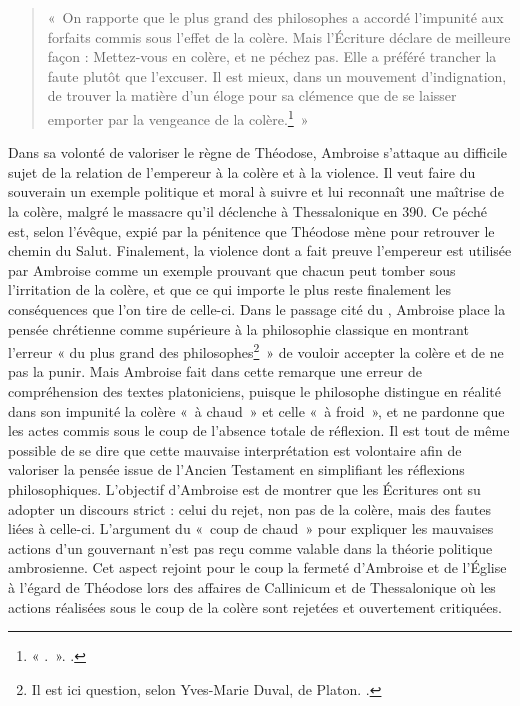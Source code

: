 \bigskip

\begin{quote}
    «~On rapporte que le plus grand des philosophes a accordé l’impunité aux forfaits commis sous l’effet de la colère. Mais l’Écriture déclare de meilleure façon : Mettez-vous en colère, et ne péchez pas. Elle a préféré trancher la faute plutôt que l’excuser. Il est mieux, dans un mouvement d’indignation, de trouver la matière d’un éloge pour sa clémence que de se laisser emporter par la vengeance de la colère.\footnote{« .~». \cite[]{ambroise_mort_theodose}.}~»
\end{quote}

\bigskip

Dans sa volonté de valoriser le règne de Théodose, Ambroise s'attaque au difficile sujet de la relation de l'empereur à la colère et à la violence. Il veut faire du souverain un exemple politique et moral à suivre et lui reconnaît une maîtrise de la colère, malgré le massacre qu'il déclenche à Thessalonique en 390. Ce péché est, selon l'évêque, expié par la pénitence que Théodose mène pour retrouver le chemin du Salut. Finalement, la violence dont a fait preuve l'empereur est utilisée par Ambroise comme un exemple prouvant que chacun peut tomber sous l'irritation de la colère, et que ce qui importe le plus reste finalement les conséquences que l'on tire de celle-ci. Dans le passage cité du , Ambroise place la pensée chrétienne comme supérieure à la philosophie classique en montrant l'erreur « du plus grand des philosophes\footnote{Il est ici question, selon Yves-Marie Duval, de Platon. \cite[Note 1 page 166]{ambroise_devoirs_1}.}~» de vouloir accepter la colère et de ne pas la punir. Mais Ambroise fait dans cette remarque une erreur de compréhension des textes platoniciens, puisque le philosophe distingue en réalité dans son impunité la colère «~à chaud~» et celle «~à froid~», et ne pardonne que les actes commis sous le coup de l'absence totale de réflexion\autocite{ambroise_devoirs_1}. Il est tout de même possible de se dire que cette mauvaise interprétation est volontaire afin de valoriser la pensée issue de l'Ancien Testament en simplifiant les réflexions philosophiques. L'objectif d'Ambroise est de montrer que les Écritures ont su adopter un discours strict : celui du rejet, non pas de la colère, mais des fautes liées à celle-ci. L'argument du «~coup de chaud~» pour expliquer les mauvaises actions d'un gouvernant n'est pas reçu comme valable dans la théorie politique ambrosienne. Cet aspect rejoint pour le coup la fermeté d'Ambroise et de l'Église à l'égard de Théodose lors des affaires de Callinicum et de Thessalonique où les actions réalisées sous le coup de la colère sont rejetées et ouvertement critiquées.

